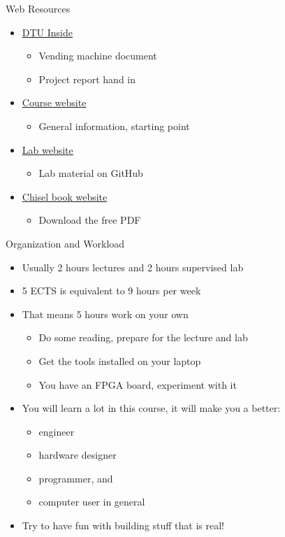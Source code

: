 \documentclass[xcolor=pdflatex,dvipsnames,table]{beamer}
\begin{document}
\begin{frame}[fragile]{Web Resources}
\begin{itemize}
\item \href{https://cn.inside.dtu.dk/cnnet/element/612883/frontpage}{DTU Inside}
\begin{itemize}
\item Vending machine document
\item Project report hand in
\end{itemize}
\item \href{http://www2.imm.dtu.dk/courses/02139/}{Course website}
\begin{itemize}
\item General information, starting point
\end{itemize}
\item \href{https://github.com/schoeberl/chisel-lab}{Lab website}
\begin{itemize}
\item Lab material on GitHub
\end{itemize}
\item \href{http://www.imm.dtu.dk/~masca/chisel-book.html}{Chisel book website}
\begin{itemize}
\item Download the free PDF
\end{itemize}
\end{itemize}
\end{frame}

\begin{frame}[fragile]{Organization and Workload}
\begin{itemize}
\item Usually 2 hours lectures and 2 hours supervised lab
\item 5 ECTS is equivalent to 9 hours per week
\item That means 5 hours work on your own
\begin{itemize}
\item Do some reading, prepare for the lecture and lab
\item Get the tools installed on your laptop
\item You have an FPGA board, experiment with it
\end{itemize}
\item You will learn a lot in this course, it will make you a better:
\begin{itemize}
\item engineer
\item hardware designer
\item programmer, and
\item computer user in general
\end{itemize}
\item Try to have fun with building stuff that is real!
\end{itemize}
\end{frame}
\end{document}
